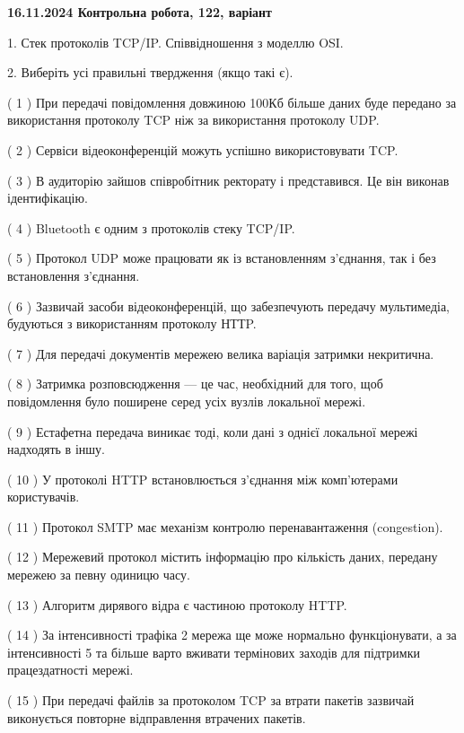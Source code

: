 \documentclass[12pt, ukrainian]{article}
\begin{document}
\vspace{4mm}
\newpage
\begin {large}

\textbf{16.11.2024 Контрольна робота, 122, варіант  }\par


{
1. Стек протоколів TCP/IP. Співвідношення з моделлю OSI.



\vspace{5mm}
2. Виберіть усі правильні твердження (якщо такі є).\par
\vspace{2mm}

( 1 ) При передачі повідомлення довжиною 100Кб більше даних буде передано за використання протоколу TCP ніж за використання протоколу UDP.

( 2 ) Сервіси відеоконференцій можуть успішно використовувати TCP.

( 3 ) В аудиторію зайшов співробітник ректорату і представився. Це він виконав ідентифікацію.

( 4 ) Bluetooth є одним з протоколів стеку TCP/IP.

( 5 ) Протокол UDP може працювати як із встановленням з'єднання, так і без встановлення з'єднання.

( 6 ) Зазвичай засоби відеоконференцій, що забезпечують передачу мультимедіа, будуються з використанням протоколу НТТP.

( 7 ) Для передачі документів мережею велика варіація затримки некритична.

( 8 ) Затримка розповсюдження — це час, необхідний для того, щоб повідомлення було поширене серед усіх вузлів локальної мережі.

( 9 ) Естафетна передача виникає тоді, коли дані з однієї локальної мережі надходять в іншу.

( 10 ) У протоколі HTTP встановлюється з'єднання між комп'ютерами користувачів.

( 11 ) Протокол SMTP має механізм контролю перенавантаження (congestion).

( 12 ) Мережевий протокол містить інформацію про кількість даних, передану мережею за певну одиницю часу.

( 13 ) Алгоритм дирявого відра є частиною протоколу HTTP.

( 14 ) За інтенсивності трафіка 2 мережа ще може нормально функціонувати, а за інтенсивності 5 та більше варто вживати термінових заходів для підтримки працездатності мережі.

( 15 ) При передачі файлів за протоколом TCP за втрати пакетів зазвичай виконується повторне відправлення втрачених пакетів.
}
\end {large}
\end{document}
